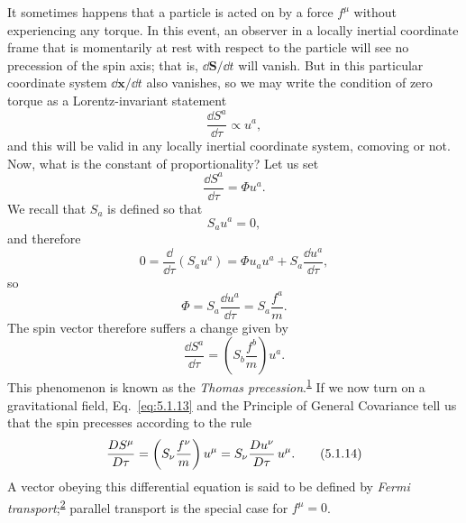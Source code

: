 It sometimes happens that a particle is acted on by a force \(f^\mu\)
without experiencing any torque. In this event, an observer in a locally
inertial coordinate frame that is momentarily at rest with respect to the
particle will see no precession of the spin axis; that is,
\(\dd\mathbf S/\dd t\) will vanish. But in this particular coordinate system
\(\dd\mathbf x/\dd t\) also vanishes, so we may write the condition of zero
torque as a Lorentz-invariant statement
\[
  \frac{\dd S^a}{\dd\tau}\propto u^a,
\]
and this will be valid in any locally inertial coordinate system, comoving or
not. Now, what is the constant of proportionality? Let us set
\[
  \frac{\dd S^a}{\dd\tau}=\Phi u^a.
\]
We recall that \(S_a\) is defined so that
\[
  S_a u^a=0,
\]
and therefore
\[
  0
  =
  \frac{\dd}{\dd\tau}\left(S_a u^a\right)
  =
  \Phi u_a u^a
  +
  S_a\frac{\dd u^a}{\dd\tau},
\]
so
\[
  \Phi
  =
  S_a\frac{\dd u^a}{\dd\tau}
  =
  S_a\frac{f^a}{m}.
\]
The spin vector therefore suffers a change given by
\begin{equation}
  \frac{\dd S^a}{\dd\tau}
  =
  \left(S_b\frac{f^b}{m}\right)u^a.
  \tag{5.1.13}\label{eq:5.1.13}
\end{equation}
This phenomenon is known as the \textit{Thomas
precession}.\textsuperscript{\hyperref[ch5-ref-1]{1}} If we now turn on a
gravitational field, Eq.~\eqref{eq:5.1.13} and the Principle of General
Covariance tell us that the spin precesses according to the rule
\begin{equation}
  \frac{D S^\mu}{D\tau}
  =
  \left(S_\nu\frac{f^\nu}{m}\right)u^\mu
  =
  S_\nu\frac{D u^\nu}{D\tau}\,u^\mu.
  \tag{5.1.14}\label{eq:5.1.14}
\end{equation}
A vector obeying this differential equation is said to be defined by
\textit{Fermi transport};\textsuperscript{\hyperref[ch5-ref-2]{2}} parallel
transport is the special case for \(f^\mu=0\).
